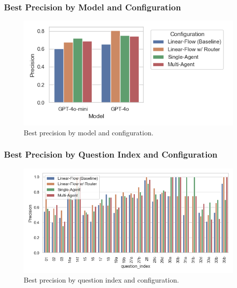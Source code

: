             \subsubsection{Best Precision by Model and Configuration}
            \begin{figure}[H]
                \centering
                \includegraphics[scale=0.75]{images_exp2/precision/bar_best_precision_by_model_and_configuration.png}
                \caption{Best precision by model and configuration.}
                \label{fig:bar_best_precision_by_model_and_configuration}
            \end{figure}

            \subsubsection{Best Precision by Question Index and Configuration}
            \begin{figure}[H]
                \centering
                \includegraphics[scale=0.75]{images_exp2/precision/best_precision_by_question_index_and_configuration.png}
                \caption{Best precision by question index and configuration.}
                \label{fig:best_precision_by_question_index_and_configuration}
            \end{figure}

